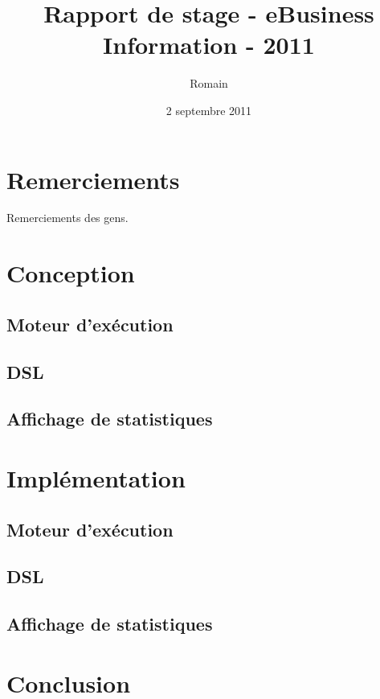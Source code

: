 \documentclass[12pt]{book}
\title{Rapport de stage - eBusiness Information - 2011}
\author{Romain \bsc{Sertelon}}
\date{2 septembre 2011}
\begin{document}
\maketitle


\frontmatter

\chapter{Remerciements}
Remerciements des gens.
  


\mainmatter





  
\chapter{Conception}
\section{Moteur d'exécution}
\section{DSL}
\section{Affichage de statistiques}
  
\chapter{Implémentation}
\section{Moteur d'exécution}
\section{DSL}
\section{Affichage de statistiques}
  
\chapter{Conclusion}
  
\end{document}
